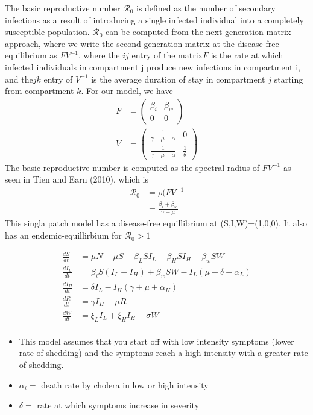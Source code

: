 \documentclass[12pt]{article}\usepackage[]{graphicx}\usepackage[]{color}
\begin{document}
The basic reproductive number $\mathcal R_0$ is defined as the number of secondary infections as a result of introducing a single infected individual into a completely susceptible population. $\mathcal R_0$ can be computed from the next generation matrix approach, where we write the second generation matrix at the disease free equilibrium as $FV^{−1}$, where the $i$$j$ entry of the matrix$ F$ is the rate at
which infected individuals in compartment j produce new infections in compartment i, and the$ j$$k$ entry of $V^{−1}$ is the average duration of stay in compartment $j$ starting from compartment $k$. For our model, we have
\begin{align*}
		F&=\begin{pmatrix}
			\beta_i & \beta_w\\
			0 & 0
			\end{pmatrix}\\
		V&=\begin{pmatrix}
			\frac{1}{\gamma+\mu+\alpha} & 0\\
			\frac{1}{\gamma+\mu+\alpha} &\frac{1}{\theta}
			\end{pmatrix}
\end{align*}
The basic reproductive number is computed as the spectral radius of $FV^{-1}$ as seen in Tien and Earn (2010), which is
\begin{align*}
\mathcal R_0&=\rho(FV^{-1}\\
		&=\frac{\beta_i+\beta_w}{\gamma+\mu}
\end{align*}
This singla patch model has a disease-free equillibrium at (S,I,W)=(1,0,0). It also has an endemic-equillirbium for  $\mathcal R_0>1$


\begin{align*}
	\frac{dS}{dt}&= \mu N - \mu S - \beta_L S I_L - \beta_H S I_H - \beta_w S W  \\
	\frac{dI_L}{dt}&= \beta_i S( I_L + I_H) + \beta_w S W - I_L (\mu + \delta + \alpha_L) \\
	\frac{dI_H}{dt}&= \delta I_L - I_H (\gamma + \mu + \alpha_H) \\
	\frac{dR}{dt}&= \gamma I_H - \mu R \\
	\frac{dW}{dt}&= \xi_L I_L + \xi_H I_H  - \sigma W\\
	\end{align*}

\begin{itemize}
	\item This model assumes that you start off with low intensity symptoms (lower rate of shedding) and the symptoms reach a high intensity with a greater rate of shedding.
	\item$\alpha_i=$ death rate by cholera in low or high intensity
	\item$\delta =$ rate at which symptoms increase in severity
\end{itemize}
\end{document}
